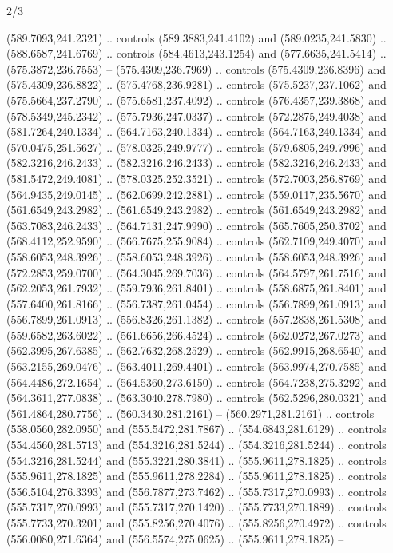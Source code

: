 \begin{flagdescription}{2/3}
\begin{scope}[xshift=0.5\flaglength,yshift=0.5\flagwidth,scale=\flagwidth/525.28]
\begin{scope}[y=0.1mm, x=0.1mm, yscale=-1,shift={(-381.5,-404)}]
  (589.7093,241.2321) .. controls (589.3883,241.4102) and (589.0235,241.5830) ..
  (588.6587,241.6769) .. controls (584.4613,243.1254) and (577.6635,241.5414) ..
  (575.3872,236.7553) -- (575.4309,236.7969) .. controls (575.4309,236.8396) and
  (575.4309,236.8822) .. (575.4768,236.9281) .. controls (575.5237,237.1062) and
  (575.5664,237.2790) .. (575.6581,237.4092) .. controls (576.4357,239.3868) and
  (578.5349,245.2342) .. (575.7936,247.0337) .. controls (572.2875,249.4038) and
  (581.7264,240.1334) .. (564.7163,240.1334) .. controls (564.7163,240.1334) and
  (570.0475,251.5627) .. (578.0325,249.9777) .. controls (579.6805,249.7996) and
  (582.3216,246.2433) .. (582.3216,246.2433) .. controls (582.3216,246.2433) and
  (581.5472,249.4081) .. (578.0325,252.3521) .. controls (572.7003,256.8769) and
  (564.9435,249.0145) .. (562.0699,242.2881) .. controls (559.0117,235.5670) and
  (561.6549,243.2982) .. (561.6549,243.2982) .. controls (561.6549,243.2982) and
  (563.7083,246.2433) .. (564.7131,247.9990) .. controls (565.7605,250.3702) and
  (568.4112,252.9590) .. (566.7675,255.9084) .. controls (562.7109,249.4070) and
  (558.6053,248.3926) .. (558.6053,248.3926) .. controls (558.6053,248.3926) and
  (572.2853,259.0700) .. (564.3045,269.7036) .. controls (564.5797,261.7516) and
  (562.2053,261.7932) .. (559.7936,261.8401) .. controls (558.6875,261.8401) and
  (557.6400,261.8166) .. (556.7387,261.0454) .. controls (556.7899,261.0913) and
  (556.7899,261.0913) .. (556.8326,261.1382) .. controls (557.2838,261.5308) and
  (559.6582,263.6022) .. (561.6656,266.4524) .. controls (562.0272,267.0273) and
  (562.3995,267.6385) .. (562.7632,268.2529) .. controls (562.9915,268.6540) and
  (563.2155,269.0476) .. (563.4011,269.4401) .. controls (563.9974,270.7585) and
  (564.4486,272.1654) .. (564.5360,273.6150) .. controls (564.7238,275.3292) and
  (564.3611,277.0838) .. (563.3040,278.7980) .. controls (562.5296,280.0321) and
  (561.4864,280.7756) .. (560.3430,281.2161) -- (560.2971,281.2161) .. controls
  (558.0560,282.0950) and (555.5472,281.7867) .. (554.6843,281.6129) .. controls
  (554.4560,281.5713) and (554.3216,281.5244) .. (554.3216,281.5244) .. controls
  (554.3216,281.5244) and (555.3221,280.3841) .. (555.9611,278.1825) .. controls
  (555.9611,278.1825) and (555.9611,278.2284) .. (555.9611,278.1825) .. controls
  (556.5104,276.3393) and (556.7877,273.7462) .. (555.7317,270.0993) .. controls
  (555.7317,270.0993) and (555.7317,270.1420) .. (555.7733,270.1889) .. controls
  (555.7733,270.3201) and (555.8256,270.4076) .. (555.8256,270.4972) .. controls
  (556.0080,271.6364) and (556.5574,275.0625) .. (555.9611,278.1825) --

\end{scope}
\end{scope}
\end{flagdescription}
